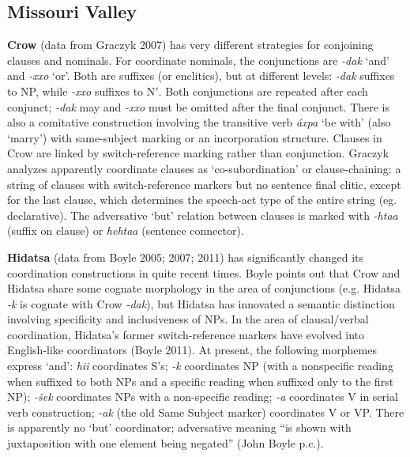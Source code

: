 \documentclass[output=paper]{LSP/langsci}
\begin{document}
\subsection{Missouri Valley}
 
\textbf{Crow} (data from Graczyk 2007) has very different strategies for conjoining clauses and
nominals. For coordinate nominals, the conjunctions are \textit{-dak} `and' and \textit{-xxo} `or'. Both are suffixes (or enclitics), but at different levels: \textit{-dak} suffixes to NP, while \textit{-xxo} suffixes to N$'$. Both conjunctions are repeated after each conjunct; \textit{-dak} may and \textit{-xxo} must be omitted after the final conjunct. There is also a comitative construction involving the transitive verb \textit{\'axpa} `be with' (also `marry') with same-subject marking or an incorporation structure. Clauses in Crow are linked by switch-reference marking rather than conjunction. Graczyk analyzes apparently coordinate clauses as `co-subordination' or clause-chaining: a string of clauses with switch-reference markers but no sentence final clitic, except for the last clause, which determines the speech-act type of the entire string (eg. declarative). The adversative `but' relation between clauses is marked with \textit{-htaa} (suffix on clause) or \textit{hehtaa} (sentence connector).

\textbf{Hidatsa} (data from Boyle 2005; 2007; 2011) has significantly changed its coordination constructions in quite recent times. Boyle points out that Crow and Hidatsa share some cognate morphology in the area of conjunctions (e.g. Hidatsa \textit{-k} is cognate with Crow \textit{-dak}), but Hidatsa has innovated a semantic distinction involving specificity and inclusiveness of NPs. In the area of clausal/verbal coordination, Hidatsa's former switch-reference markers have evolved into English-like coordinators (Boyle 2011). At present, the following morphemes express `and': \textit{hii} coordinates S's; \textit{-k} coordinates NP (with a nonspecific reading when suffixed to both NPs and a specific reading when suffixed only to the first NP); \textit{-\v{s}ek} coordinates NPs with a non-specific reading; \textit{-a} coordinates V in serial verb construction; \textit{-ak} (the old Same Subject marker) coordinates V or VP. There is apparently no `but' coordinator; adversative meaning ``is shown with juxtaposition with one element being negated'' (John Boyle p.c.).
\end{document}
